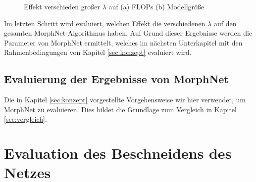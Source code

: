 \begin{figure}
     \centering
     \hfill
     \caption{Effekt verschieden großer $\lambda$ auf  (a) FLOPs (b) Modellgröße }
     \label{abb:morph2}
\end{figure}
Im letzten Schritt wird evaluiert, welchen Effekt die verschiedenen $\lambda$ auf den gesamten MorphNet-Algorithmus haben. Auf Grund dieser Ergebnisse werden die Parameter von MorphNet ermittelt, welches im nächsten Unterkapitel mit den Rahmenbedingungen von Kapitel \ref{sec:konzept} evaluiert wird.



\section{Evaluierung der Ergebnisse von MorphNet}

Die in Kapitel \ref{sec:konzept}  vorgestellte Vorgehensweise wir hier verwendet, um MorphNet zu evaluieren. Dies bildet die Grundlage zum Vergleich in Kapitel \ref{sec:vergleich}.





\color{black}





\chapter{Evaluation des Beschneidens des Netzes}\label{sec:ptexperimente}

